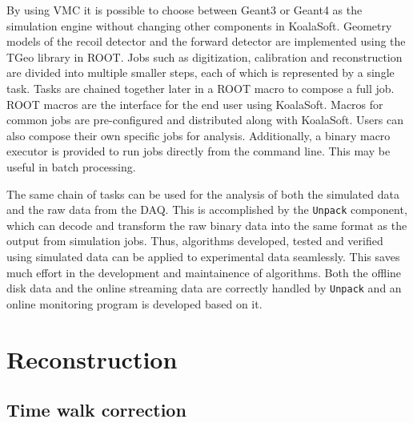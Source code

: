 \documentclass[number,5p]{elsarticle}
\begin{document}
By using VMC it is possible to choose between Geant3 or Geant4 as the simulation engine without changing other components in KoalaSoft.
Geometry models of the recoil detector and the forward detector are implemented
using the TGeo library in ROOT.
Jobs such as digitization, calibration and reconstruction are divided into multiple smaller steps, each of which is represented by a single task.
Tasks are chained together later in a ROOT macro to compose a full job. 
ROOT macros are the interface for the end user using KoalaSoft.
Macros for common jobs are pre-configured and distributed along with KoalaSoft.
Users can also compose their own specific jobs for analysis.
Additionally, a binary macro executor is provided to run jobs directly from the command line. This may be useful in batch processing.

The same chain of tasks can be used for the analysis of both the simulated data
and the raw data from the DAQ.
This is accomplished by the \texttt{Unpack} component, which can decode and transform the raw binary data into the same format as the output from simulation jobs.
Thus, algorithms developed, tested and verified using simulated data can be applied to experimental data seamlessly.
This saves much effort in the development and maintainence of algorithms.
Both the offline disk data and the online streaming data are correctly handled by \texttt{Unpack} and an online monitoring program is developed based on it.

\section{Reconstruction}
\label{sec:reconstruction}

\subsection{Time walk correction}
\label{sec:timewalk}
\end{document}

